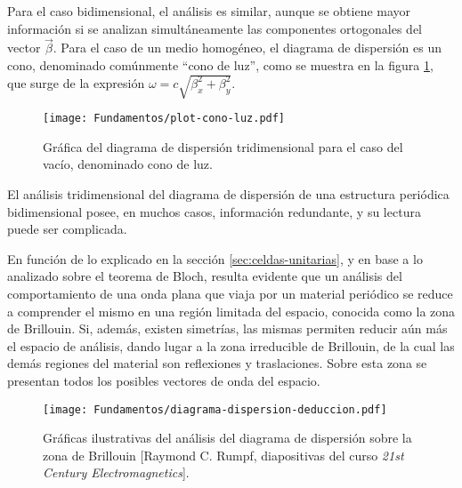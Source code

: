 Para el caso bidimensional, el análisis es similar, aunque se obtiene mayor información si se analizan simultáneamente las componentes ortogonales del vector $\vec{\beta}$. Para el caso de un medio homogéneo, el diagrama de dispersión es un cono, denominado comúnmente \enquote{cono de luz}, como se muestra en la figura \ref{fig:diagrama-dispersion-vacio-3d}, que surge de la expresión $\omega = c \sqrt{\beta_x^2 + \beta_y^2}$.

\begin{figure}[htp]
	\centering
	\texttt{[image: Fundamentos/plot-cono-luz.pdf]}
	\caption{Gráfica del diagrama de dispersión tridimensional para el caso del vacío, denominado cono de luz.}
	\label{fig:diagrama-dispersion-vacio-3d}
\end{figure}

El análisis tridimensional del diagrama de dispersión de una estructura periódica bidimensional posee, en muchos casos, información redundante, y su lectura puede ser complicada.

En función de lo explicado en la sección \ref{sec:celdas-unitarias}, y en base a lo analizado sobre el teorema de Bloch, resulta evidente que un análisis del comportamiento de una onda plana que viaja por un material periódico se reduce a comprender el mismo en una región limitada del espacio, conocida como la zona de Brillouin. Si, además, existen simetrías, las mismas permiten reducir aún más el espacio de análisis, dando lugar a la zona irreducible de Brillouin, de la cual las demás regiones del material son reflexiones y traslaciones. Sobre esta zona se presentan todos los posibles vectores de onda del espacio.

\begin{figure}[h]
	\centering
	\texttt{[image: Fundamentos/diagrama-dispersion-deduccion.pdf]}
	\caption{Gráficas ilustrativas del análisis del diagrama de dispersión sobre la zona de Brillouin [Raymond C. Rumpf, diapositivas del curso \textit{21st Century Electromagnetics}].}
	\label{fig:diagrama-dispersion-completo-deduccion}
\end{figure}

